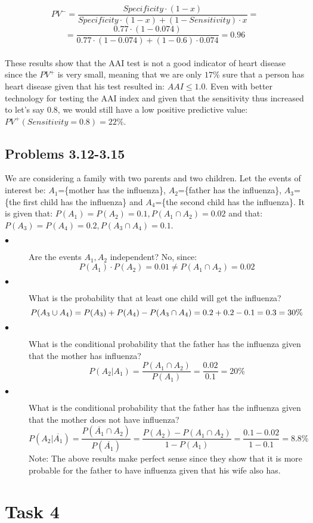 \documentclass[12pt,a4paper]{article}
\begin{document}
$$PV^-=\frac{Specificity\cdot (1-x)}{Specificity\cdot (1-x) + (1-Sensitivity)\cdot x}=$$
$$=\frac{0.77\cdot (1-0.074)}{0.77\cdot (1-0.074) + (1-0.6)\cdot0.074}=0.96$$
\\
These results show that the AAI test is not a good indicator of heart disease since the $PV^+$ is very small, meaning that we are only $17\%$ sure that a person has heart disease given that his test resulted in: $AAI\leq1.0$. Even with better technology for testing the AAI index and given that the sensitivity thus increased to let's say $0.8$, we would still have a low positive predictive value: $PV^+(Sensitivity=0.8)=22\%$.

\subsection*{Problems 3.12-3.15}
We are considering a family with two parents and two children. Let the events of interest be: $A_1$=\{mother has the influenza\}, $A_2$=\{father has the influenza\}, $A_3$=\{the first child has the influenza\} and $A_4$=\{the second child has the influenza\}. It is given that: $P(A_1)=P(A_2)=0.1, P(A_1\cap A_2)=0.02$ and that: $P(A_3)=P(A_4)=0.2, P(A_3\cap A_4)=0.1$.

\begin{description}
  \item[$\bullet$] Are the events $A_1,A_2$ independent? No, since:
  $$P(A_1)\cdot P(A_2)=0.01\neq P(A_1\cap A_2)=0.02$$
  \item[$\bullet$] What is the probability that at least one child will get the influenza?
  $$P(A_3\cup A_4)=P(A_3)+P(A_4)-P(A_3\cap A_4)=0.2+0.2-0.1\\=0.3=30\%$$
  \item[$\bullet$] What is the conditional probability that the father has the influenza given that the mother has influenza?
  $$P(A_2|A_1)=\frac{P(A_1\cap A_2)}{P(A_1)}=\frac{0.02}{0.1}=20\%$$
  \item[$\bullet$] What is the conditional probability that the father has the influenza given that the mother does not have influenza?
  $$P(A_2|\overline{A_1})=\frac{P(\overline{A_1}\cap A_2)}{P(\overline{A_1})}=\frac{P(A_2)-P(A_1\cap A_2)}{1-P(A_1)}=\frac{0.1-0.02}{1-0.1}=8.8\%$$
  Note: The above results make perfect sense since they show that it is more probable for the father to have influenza given that his wife also has.
\end{description}

\section*{Task 4}
\end{document}
